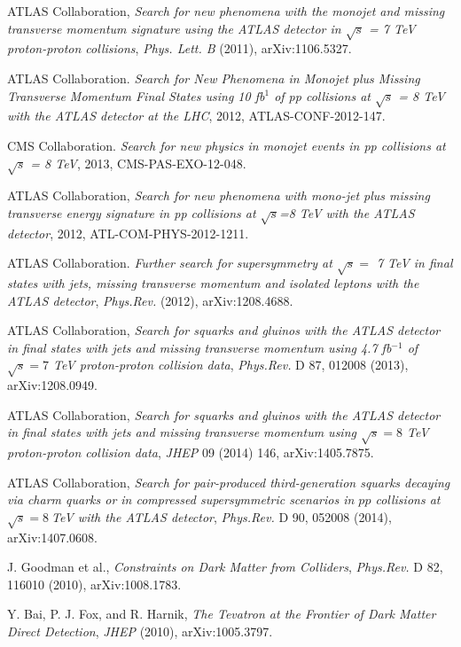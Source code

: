  ATLAS Collaboration, \emph{Search for new phenomena with the monojet and missing transverse momentum signature using the ATLAS detector in $\sqrt{s}$ = 7 TeV proton-proton collisions}, \emph{Phys. Lett. B} (2011), arXiv:1106.5327.

 ATLAS Collaboration. \emph{Search for New Phenomena in Monojet plus Missing Transverse Momentum Final States using 10 fb$^{1}$ of pp collisions at $\sqrt{s}$ = 8 TeV with the ATLAS detector at the LHC}, 2012, ATLAS-CONF-2012-147.

 CMS Collaboration. \emph{Search for new physics in monojet events in pp collisions at $\sqrt{s}$ = 8 TeV}, 2013, CMS-PAS-EXO-12-048.

 ATLAS Collaboration, \emph{Search for new phenomena with mono-jet plus missing transverse energy signature in pp collisions at $\sqrt{s}$=8 TeV with the ATLAS detector}, 2012, ATL-COM-PHYS-2012-1211.

 ATLAS Collaboration. \emph{Further search for supersymmetry at $\sqrt{s} =$ 7 TeV in final states with jets, missing transverse momentum and isolated leptons with the ATLAS detector}, \emph{Phys.Rev.} (2012), arXiv:1208.4688.

 ATLAS Collaboration, \emph{Search for squarks and gluinos with the ATLAS detector in final states with jets and missing transverse momentum using 4.7 fb$^{-1}$ of $\sqrt{s}=7$ TeV proton-proton collision data}, \emph{Phys.Rev.} D 87, 012008 (2013), arXiv:1208.0949.

 ATLAS Collaboration, \emph{Search for squarks and gluinos with the ATLAS detector in final states with jets and missing transverse momentum using $\sqrt{s}=8$ TeV proton-proton collision data}, \emph{JHEP} 09 (2014) 146, arXiv:1405.7875.

 ATLAS Collaboration, \emph{Search for pair-produced third-generation squarks decaying via charm quarks or in compressed supersymmetric scenarios in $pp$ collisions at $\sqrt{s}=8~$TeV with the ATLAS detector}, \emph{Phys.Rev.} D 90, 052008 (2014), arXiv:1407.0608.

 J. Goodman et al., \emph{Constraints on Dark Matter from Colliders}, \emph{Phys.Rev.} D 82, 116010 (2010), arXiv:1008.1783.

 Y. Bai, P. J. Fox, and R. Harnik, \emph{The Tevatron at the Frontier of Dark Matter Direct Detection}, \emph{JHEP} (2010), arXiv:1005.3797.


